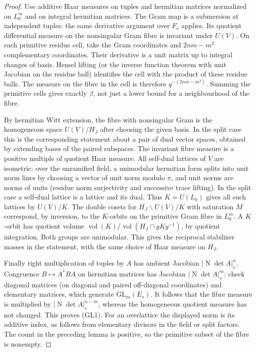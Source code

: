 \begin{proof}
Use additive Haar measures on tuples and hermitian matrices
normalized on \(L_0^m\) and on integral hermitian matrices.
The Gram map is a submersion at independent tuples: the same
derivative argument over \(F_v\) applies. Its quotient differential
measure on the nonsingular Gram fibre is invariant under \(U(V)\).
On each primitive residue cell, take the Gram coordinates and
\(2nm-m^2\) complementary coordinates. Their derivative is a
unit matrix up to integral changes of basis. Hensel lifting
(or the inverse function theorem with unit Jacobian on the
residue ball) identifies the cell with the product of these
residue balls. The measure on the fibre in the cell is therefore
\(q^{-(2nm-m^2)}\). Summing the primitive cells gives exactly
\(\beta\), not just a lower bound for a neighbourhood of the fibre.

By hermitian Witt extension, the fibre with nonsingular Gram is
the homogeneous space \(U(V)/H_J\) after choosing the given basis.
In the split case this is the corresponding statement about a
pair of dual vector spaces, obtained by extending bases of the
paired subspaces. The invariant fibre measure is a positive
multiple of quotient Haar measure. All self-dual lattices of \(V\)
are isometric: over the unramified field, a unimodular hermitian
form splits into unit norm lines by choosing a vector of unit norm
modulo \(\pi\), and unit norms are norms of units (residue norm
surjectivity and successive trace lifting). In the split case
a self-dual lattice is a lattice and its dual. Thus
\(K=U(L_0)\) gives all such lattices by \(U(V)/K\).
The double cosets for \(H_J\backslash U(V)/K\) with saturation \(M\)
correspond, by inversion, to the \(K\)-orbits on the primitive
Gram fibre in \(L_0^m\). A \(K\)-orbit has quotient volume
\(\operatorname{vol}(K)/\operatorname{vol}(H_J\cap gKg^{-1})\),
by quotient integration. Both groups are unimodular.
This gives the reciprocal stabilizer masses in the statement,
with the same choice of Haar measure on \(H_J\).

Finally right multiplication of tuples by \(A\) has ambient
Jacobian \(|\operatorname{N}\det A|_v^n\).
Congruence \(B\mapsto A^*BA\) on hermitian matrices has Jacobian
\(|\operatorname{N}\det A|_v^m\): check diagonal matrices
(on diagonal and paired off-diagonal coordinates) and elementary
matrices, which generate \(\mathrm{GL}_m(E_v)\). It follows that
the fibre measure is multiplied by
\(|\operatorname{N}\det A|_v^{n-m}\), whereas the homogeneous
quotient measure has not changed. This proves (GL1).
For an overlattice the displayed norm is its additive index,
as follows from elementary divisors in the field or split
factors. The count in the preceding lemma is positive, so the
primitive subset of the fibre is nonempty.
\end{proof}

